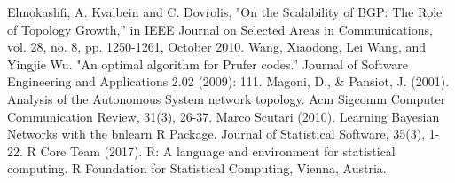 \documentclass[conference]{IEEEtran}
\begin{document}
\begin{thebibliography}{00}
 Elmokashfi, A. Kvalbein and C. Dovrolis, "On the Scalability of BGP: The Role of Topology Growth,” in IEEE Journal on Selected Areas in Communications, vol. 28, no. 8, pp. 1250-1261, October 2010.
 Wang, Xiaodong, Lei Wang, and Yingjie Wu. "An optimal algorithm for Prufer codes.” Journal of Software Engineering and Applications 2.02 (2009): 111.
 Magoni, D., \& Pansiot, J. (2001). Analysis of the Autonomous System network topology. Acm Sigcomm Computer Communication Review, 31(3), 26-37.
 Marco Scutari (2010). Learning Bayesian Networks with the bnlearn R Package. Journal of Statistical Software, 35(3), 1-22.
 R Core Team (2017). R: A language and environment for statistical computing. R Foundation for Statistical Computing, Vienna, Austria.

\end{thebibliography}
\end{document}
